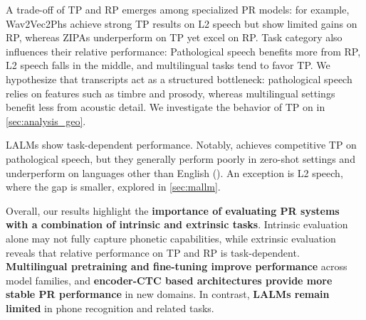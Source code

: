 A trade-off of TP and RP emerges among specialized PR models: for example, Wav2Vec2Phs achieve strong TP results on L2 speech but show limited gains on RP, whereas ZIPAs underperform on TP yet excel on RP. 
Task category also influences their relative performance: Pathological speech benefits more from RP, L2 speech falls in the middle, and multilingual tasks tend to favor TP. 
We hypothesize that transcripts act as a structured bottleneck: pathological speech relies on features such as timbre and prosody, whereas multilingual settings benefit less from acoustic detail.
We investigate the behavior of TP on \geov in \autoref{sec:analysis_geo}.

LALMs show task-dependent performance. Notably, \qweni achieves competitive TP on pathological speech, but they generally perform poorly in zero-shot settings and underperform on languages other than English (\ez). An exception is L2 speech, where the gap is smaller, explored in \autoref{sec:mallm}.

Overall, our results highlight the \textbf{importance of evaluating PR systems with a combination of intrinsic and extrinsic tasks}. 
Intrinsic evaluation alone may not fully capture phonetic capabilities, while extrinsic evaluation reveals that relative performance on TP and RP is task-dependent. 
\textbf{Multilingual pretraining and fine-tuning improve performance} across model families, and \textbf{encoder-CTC based architectures provide more stable PR performance} in new domains. 
In contrast, \textbf{LALMs remain limited} in phone recognition and related tasks.